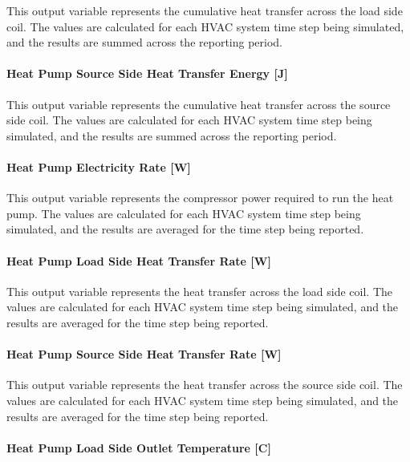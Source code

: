 This output variable represents the cumulative heat transfer across the load side coil. The values are calculated for each HVAC system time step being simulated, and the results are summed across the reporting period.

\paragraph{Heat Pump Source Side Heat Transfer Energy {[}J{]}}\label{water-to-water-heat-pump-source-side-heat-transfer-energy-j}

This output variable represents the cumulative heat transfer across the source side coil. The values are calculated for each HVAC system time step being simulated, and the results are summed across the reporting period.

\paragraph{Heat Pump Electricity Rate {[}W{]}}\label{water-to-water-heat-pump-electric-power-w}

This output variable represents the compressor power required to run the heat pump. The values are calculated for each HVAC system time step being simulated, and the results are averaged for the time step being reported.

\paragraph{Heat Pump Load Side Heat Transfer Rate {[}W{]}}\label{water-to-water-heat-pump-load-side-heat-transfer-rate-w}

This output variable represents the heat transfer across the load side coil. The values are calculated for each HVAC system time step being simulated, and the results are averaged for the time step being reported.

\paragraph{Heat Pump Source Side Heat Transfer Rate {[}W{]}}\label{water-to-water-heat-pump-source-side-heat-transfer-rate-w}

This output variable represents the heat transfer across the source side coil. The values are calculated for each HVAC system time step being simulated, and the results are averaged for the time step being reported.

\paragraph{Heat Pump Load Side Outlet Temperature {[}C{]}}\label{water-to-water-heat-pump-load-side-outlet-temperature-c}


